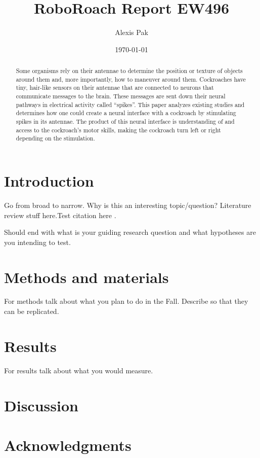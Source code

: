 \documentclass{article}
\title{RoboRoach Report EW496}
\author{Alexis Pak}
\date{\today}
\begin{document}
\maketitle
\begin{abstract}
Some organisms rely on their antennae to determine the position or texture of objects around them and, more importantly, how to maneuver around them. Cockroaches have tiny, hair-like sensors on their antennae that are connected to neurons that communicate messages to the brain. These messages are sent down their neural pathways in electrical activity called ``spikes''. This paper analyzes existing studies and determines how one could create a neural interface with a cockroach by stimulating spikes in its antennae. The product of this neural interface is understanding of and access to the cockroach's motor skills, making the cockroach turn left or right depending on the stimulation. 
\end{abstract}



\section{Introduction}
Go from broad to narrow. Why is this an interesting topic/question? Literature review stuff here.Test citation here \citep{buck2020go}.

Should end with what is your guiding research question and what hypotheses are you intending to test. 

\section{Methods and materials}
For methods talk about what you plan to do in the Fall. Describe so that they can be replicated. 

\section{Results}
For results talk about what you would measure.

\section{Discussion}

\section{Acknowledgments}


\end{document}
